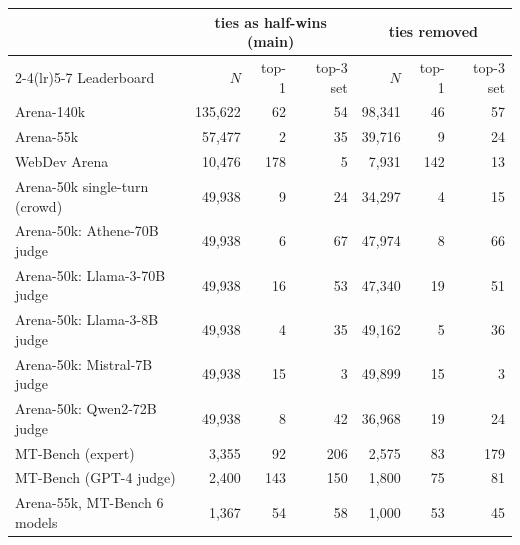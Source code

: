 \begin{tabular}{lrrrrrr}
\toprule
& \multicolumn{3}{c}{ties as half-wins (main)} & \multicolumn{3}{c}{ties removed} \\
\cmidrule(lr){2-4}\cmidrule(lr){5-7}
Leaderboard & $N$ & top-1 & top-3 set & $N$ & top-1 & top-3 set \\
\midrule
Arena-140k & 135,622 & 62 & 54 & 98,341 & 46 & 57 \\
Arena-55k & 57,477 & 2 & 35 & 39,716 & 9 & 24 \\
WebDev Arena & 10,476 & 178 & 5 & 7,931 & 142 & 13 \\
Arena-50k single-turn (crowd) & 49,938 & 9 & 24 & 34,297 & 4 & 15 \\
Arena-50k: Athene-70B judge & 49,938 & 6 & 67 & 47,974 & 8 & 66 \\
Arena-50k: Llama-3-70B judge & 49,938 & 16 & 53 & 47,340 & 19 & 51 \\
Arena-50k: Llama-3-8B judge & 49,938 & 4 & 35 & 49,162 & 5 & 36 \\
Arena-50k: Mistral-7B judge & 49,938 & 15 & 3 & 49,899 & 15 & 3 \\
Arena-50k: Qwen2-72B judge & 49,938 & 8 & 42 & 36,968 & 19 & 24 \\
MT-Bench (expert) & 3,355 & 92 & 206 & 2,575 & 83 & 179 \\
MT-Bench (GPT-4 judge) & 2,400 & 143 & 150 & 1,800 & 75 & 81 \\
Arena-55k, MT-Bench 6 models & 1,367 & 54 & 58 & 1,000 & 53 & 45 \\
\bottomrule
\end{tabular}
